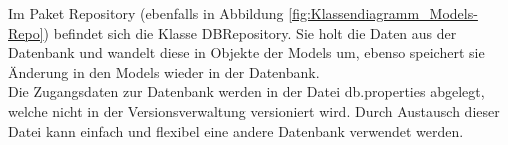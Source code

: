 Im Paket Repository (ebenfalls in Abbildung \ref{fig:Klassendiagramm_Models-Repo}) befindet sich die Klasse DBRepository. Sie holt die Daten aus der Datenbank und wandelt diese in Objekte der Models um, ebenso speichert sie Änderung in den Models wieder in der Datenbank. \\
Die Zugangsdaten zur Datenbank werden in der Datei db.properties abgelegt, welche nicht in der Versionsverwaltung versioniert wird. Durch Austausch dieser Datei kann einfach und flexibel eine andere Datenbank verwendet werden.
